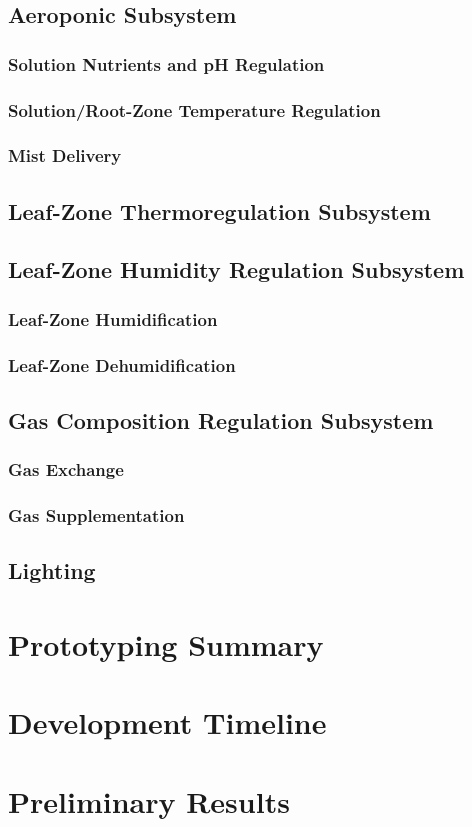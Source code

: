 \documentclass{report}
\begin{document}
\subsection{Aeroponic Subsystem}
\subsubsection{Solution Nutrients and pH Regulation}
\subsubsection{Solution/Root-Zone Temperature Regulation}
\subsubsection{Mist Delivery}
\subsection{Leaf-Zone Thermoregulation Subsystem}
\subsection{Leaf-Zone Humidity Regulation Subsystem}
\subsubsection{Leaf-Zone Humidification}
\subsubsection{Leaf-Zone Dehumidification}
\subsection{Gas Composition Regulation Subsystem}
\subsubsection{Gas Exchange}
\subsubsection{Gas Supplementation}
\subsection{Lighting}

\section{Prototyping Summary}

\section{Development Timeline}

\section{Preliminary Results}

\newpage



\end{document}
